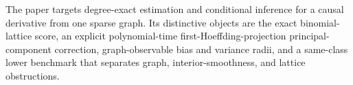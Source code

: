 The paper targets degree-exact estimation and conditional inference for a causal derivative from one sparse graph.  Its distinctive objects are the exact binomial-lattice score, an explicit polynomial-time first-Hoeffding-projection principal-component correction, graph-observable bias and variance radii, and a same-class lower benchmark that separates graph, interior-smoothness, and lattice obstructions.